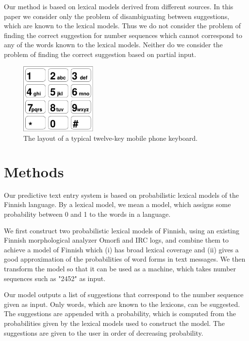 \documentclass[a4paper,conference]{IEEEtran}
\begin{document}
Our method is based on lexical models derived from different
sources. In this paper we consider only the problem of disambiguating
between suggestions, which are known to the lexical models. Thus we do
not consider the problem of finding the correct suggestion for number
sequences which cannot correspond to any of the words known to the
lexical models. Neither do we consider the problem of finding the
correct suggestion based on partial input.

\begin{figure}
\begin{center}
\includegraphics[width=1.5in]{keypad.pdf}
\end{center}
\caption{The layout of a typical twelve-key mobile phone keyboard.}
\label{fig:keypad}
\end{figure}

\section{Methods}
\label{sec:methods}

Our predictive text entry system is based on probabilistic lexical
models of the Finnish language. By a lexical model, we mean a model,
which assigns some probability between 0 and 1 to the words in a
language.

We first construct two probabilistic lexical models of Finnish,
using an existing Finnish morphological analyzer Omorfi and IRC logs, and combine
them to achieve a model of Finnish which (i) has broad lexical
coverage and (ii) gives a good approximation of the probabilities of
word forms in text messages. We then transform the model so that it
can be used as a machine, which takes number sequences such as "2452"
as input. 

Our model outputs a list of suggestions that correspond to the number
sequence given as input. Only words, which are known to the lexicons,
can be suggested. The suggestions are appended with a probability, which is
computed from the probabilities given by the lexical models used to
construct the model. The suggestions are given to the user in order of
decreasing probability.
\end{document}
